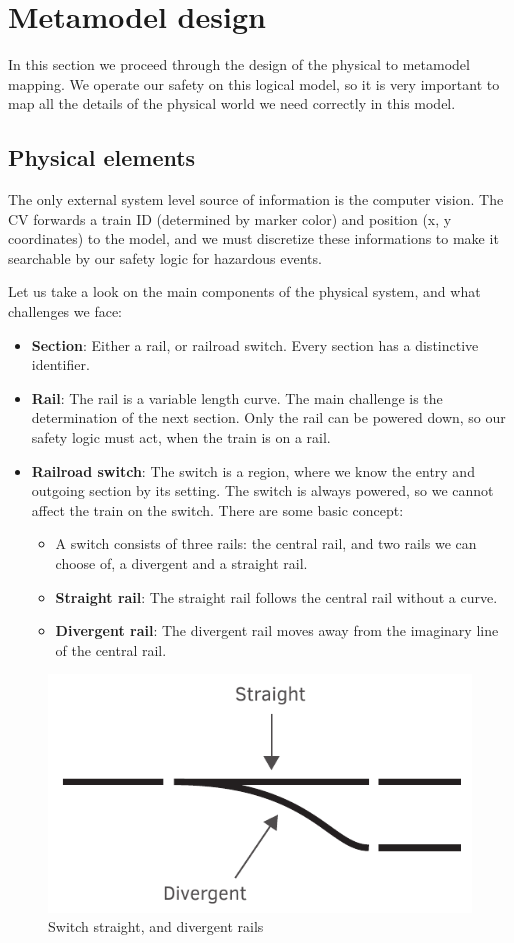 \section{Metamodel design}
In this section we proceed through the design of the physical to metamodel mapping. We operate our safety on this logical model, so it is very important to map all the details of the physical world we need correctly in this model.

\subsection{Physical elements}
The only external system level source of information is the computer vision. The CV forwards a train ID (determined by marker color) and position (x, y coordinates) to the model, and we must discretize these informations to make it searchable by our safety logic for hazardous events.

Let us take a look on the main components of the physical system, and what challenges we face:
\begin{itemize}
	\item \textbf{Section}: Either a rail, or railroad switch. Every section has a distinctive identifier.
	\item \textbf{Rail}: The rail is a variable length curve. The main challenge is the determination of the next section. Only the rail can be powered down, so our safety logic must act, when the train is on a rail.
	\item \textbf{Railroad switch}: The switch is a region, where we know the entry and outgoing section by its setting. The switch is always powered, so we cannot affect the train on the switch. There are some basic concept:
	\begin{itemize}
		\item A switch consists of three rails: the central rail, and two rails we can choose of, a divergent and a straight rail.
		\item \textbf{Straight rail}: The straight rail follows the central rail without a curve.
		\item \textbf{Divergent rail}: The divergent rail moves away from the imaginary line of the central rail.
	\end{itemize}
\end{itemize}

\begin{figure}[h]
	\centering
	\includegraphics[width=0.5\linewidth]{include/figures/chapter_6/metamodel_switch_basics}
	\caption{Switch straight, and divergent rails}
	\label{fig:case_study:metamodel_switch_basics}
\end{figure}


